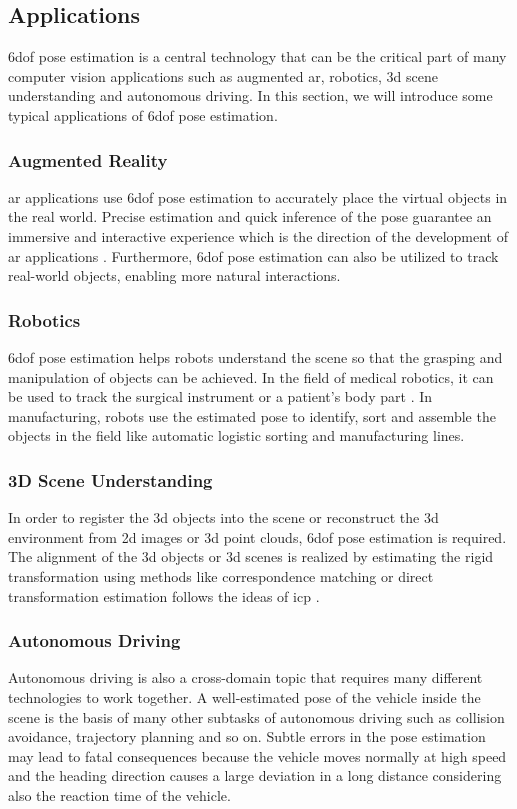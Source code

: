 \documentclass[12pt,DIV14,BCOR12mm,a4paper,footinclude=false,headinclude,parskip=half-,twoside,openright,cleardoublepage=empty,toc=index,bibliography=totoc,listof=totoc]{scrreprt}
\numberwithin{equation}{chapter}
\begin{document}
\subsection{Applications}
\gls{6dof} pose estimation is a central technology that can be the critical part of many computer vision applications such as augmented \gls{ar}, robotics, \gls{3d} scene understanding and autonomous driving. In this section, we will introduce some typical applications of \gls{6dof} pose estimation.

\subsubsection{Augmented Reality}
\gls{ar} applications use \gls{6dof} pose estimation to accurately place the virtual objects in the real world. Precise estimation and quick inference of the pose guarantee an immersive and interactive experience 
which is the direction of the development of \gls{ar} applications \cite{9836663}. Furthermore, \gls{6dof} pose estimation can also be utilized to track real-world objects, enabling more natural interactions.

\subsubsection{Robotics}
\gls{6dof} pose estimation helps robots understand the scene so that the grasping and manipulation of objects can be achieved. In the field of medical robotics, it can be used to track the surgical instrument or a patient's body part \cite{cao20236impose}. In manufacturing, robots use the estimated pose to identify, sort and assemble the objects in the field like automatic logistic sorting and manufacturing lines.

\subsubsection{3D Scene Understanding}
In order to register the \gls{3d} objects into the scene or reconstruct the \gls{3d} environment from \gls{2d} images or \gls{3d} point clouds, \gls{6dof} pose estimation is required. The alignment of the \gls{3d} objects or \gls{3d} scenes is realized by estimating the rigid transformation using methods like correspondence matching \cite{qin2022geometric} or direct transformation estimation \cite{fu2021robust} follows the ideas of \gls{icp} \cite{Besl1992AMF}.

\subsubsection{Autonomous Driving}
Autonomous driving is also a cross-domain topic that requires many different technologies to work together. A well-estimated pose of the vehicle inside the scene is the basis of many other subtasks of autonomous driving such as collision avoidance, trajectory planning and so on. Subtle errors in the pose estimation may lead to fatal consequences \cite{auto} because the vehicle moves normally at high speed and the heading direction causes a large deviation in a long distance considering also the reaction time of the vehicle.
\end{document}
